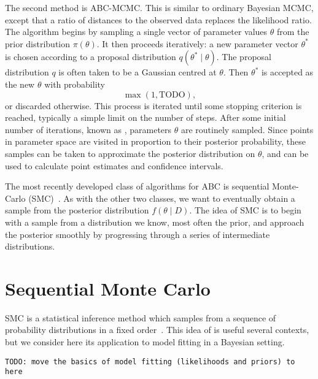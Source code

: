 The second method is \gls{ABC}-\gls{MCMC}. This is similar to ordinary Bayesian
\gls{MCMC}, except that a ratio of distances to the observed data replaces the
likelihood ratio. The algorithm begins by sampling a single vector of parameter
values $\theta$ from the prior distribution $\pi(\theta)$. It then proceeds
iteratively: a new parameter vector $\theta^*$ is chosen according to a
proposal distribution $q(\theta^* \mid \theta)$. The proposal distribution $q$
is often taken to be a Gaussian centred at $\theta$. Then $\theta^*$ is
accepted as the new $\theta$ with probability
\[
  \max\left(1, \text{TODO} \right),
\]
or discarded otherwise. This process is iterated until some stopping criterion
is reached, typically a simple limit on the number of steps. After some initial
number of iterations, known as , parameters $\theta$ are
routinely sampled. Since points in parameter space are visited in proportion to
their posterior probability, these samples can be taken to approximate the
posterior distribution on $\theta$, and can be used to calculate point
estimates and confidence intervals.

The most recently developed class of algorithms for ABC is sequential
Monte-Carlo (SMC)~\autocite{sisson2007sequential}. As with the other two
classes, we want to eventually obtain a sample from the posterior distribution
$f(\theta \mid D)$. The idea of SMC is to begin with a sample from a
distribution we know, most often the prior, and approach the posterior smoothly
by progressing through a series of intermediate distributions.

\section{Sequential Monte Carlo}

\Gls{SMC} is a statistical inference method which samples from a sequence of
probability distributions in a fixed order~\autocite{del2006sequential}. This
idea of  is useful several contexts, but we consider
here its application to model fitting in a Bayesian setting. 

\texttt{TODO: move the basics of model fitting (likelihoods and priors) to here}

